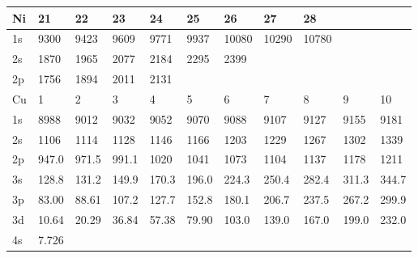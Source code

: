 \begin{table}
\begin{center}
\begin{tabular}{lllllllllll}
\hline
Ni&  21&  22&  23&  24&  25& 26&  27&  28\\
\hline
1s&  9300&  9423&  9609&  9771&  9937& 10080& 10290& 10780\\
2s& 1870& 1965&
2077&  2184&  2295&  2399\\
2p&  1756&  1894&  2011&  2131\\
\hline
Cu&   1&   2&   3&   4&   5&
6& 7&   8&   9&  10\\
\hline
1s&  8988&  9012&  9032&  9052&  9070&  9088&  9107&  9127&  9155&
9181\\
2s&  1106&  1114&  1128&  1146& 1166&  1203&  1229&  1267&  1302&  1339\\
2p& 947.0&
971.5& 991.1&  1020&  1041&  1073&  1104&  1137&  1178&  1211\\
3s& 128.8& 131.2& 149.9&
170.3& 196.0& 224.3& 250.4& 282.4& 311.3& 344.7\\
3p& 83.00& 88.61& 107.2& 127.7& 152.8&
180.1& 206.7& 237.5& 267.2& 299.9\\
3d& 10.64& 20.29& 36.84& 57.38& 79.90& 103.0& 139.0&
167.0& 199.0& 232.0\\
4s& 7.726\\
\hline
\end{tabular}
\end{center}
\end{table}


